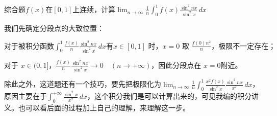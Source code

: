 \vspace{1mm}
\begin{example}
综合题$f(x)$在$[0,1]$上连续，计算$\displaystyle \lim_{n\to\infty} \frac{1}{n}\int_{0}^{1}f(x)\frac{\sin^2 nx}{\sin^2 x}\,dx$
\end{example}

\vspace{1mm}
\begin{remark}
我们先确定分段点的大致位置：

\vspace{1mm}
$ \displaystyle
\text{对于被积分函数}\int_{0}^{1} \frac{f(x) }{n}\frac{\sin^2 nx}{\sin^2 x} \, dx \text{有}x \in [0, 1] \text{ 时，} x = 0 \text{ 取 } \frac{f(0)n^2 }{n} \text{，极限不一定存在；}
$

\vspace{1mm}
$ \displaystyle
\text{对于 } x \in (0, 1]\text{，}\frac{f(x)}{n} \frac{\sin^2 nx}{\sin^2 x} \to 0 \quad (n \to +\infty)\text{，}\text{因此分段点在 } x = 0 \text{附近} \text{。}
$
\vspace{1mm}

除此之外，这道题还有一个技巧，要先把极限化为$\displaystyle \lim_{n\to\infty} \frac{1}{n}\int_{0}^{1}\frac{x^2f(x)}{\sin^2 x}\frac{\sin^2 nx}{x^2}\,dx$，原因主要在于$\displaystyle \int_{0}^{+\infty} \frac{\sin^2 x}{x^2}\,dx $，这个积分我们是可以计算出来的，可见我编的积分讲义。也可以看后面的过程加上自己的理解，来理解这一步。
\end{remark}


